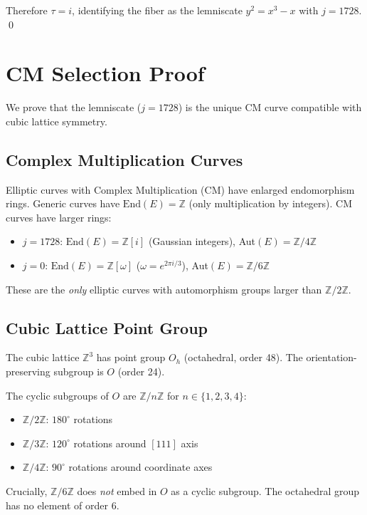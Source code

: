 \documentclass[11pt,a4paper]{article}
\theoremstyle{definition}
\theoremstyle{remark}
\newcommand{\Zthree}{\mathbb{Z}^3}
\begin{document}
Therefore $\tau = i$, identifying the fiber as the lemniscate $y^2 = x^3 - x$ with $j = 1728$. \qed

\section{CM Selection Proof}
\label{app:cm}

We prove that the lemniscate ($j = 1728$) is the unique CM curve compatible with cubic lattice symmetry.

\subsection*{Complex Multiplication Curves}

Elliptic curves with Complex Multiplication (CM) have enlarged endomorphism rings. Generic curves have $\text{End}(E) = \mathbb{Z}$ (only multiplication by integers). CM curves have larger rings:
\begin{itemize}
    \item $j = 1728$: $\text{End}(E) = \mathbb{Z}[i]$ (Gaussian integers), Aut$(E) = \mathbb{Z}/4\mathbb{Z}$
    \item $j = 0$: $\text{End}(E) = \mathbb{Z}[\omega]$ ($\omega = e^{2\pi i/3}$), Aut$(E) = \mathbb{Z}/6\mathbb{Z}$
\end{itemize}

These are the \emph{only} elliptic curves with automorphism groups larger than $\mathbb{Z}/2\mathbb{Z}$.

\subsection*{Cubic Lattice Point Group}

The cubic lattice $\Zthree$ has point group $O_h$ (octahedral, order 48). The orientation-preserving subgroup is $O$ (order 24).

The cyclic subgroups of $O$ are $\mathbb{Z}/n\mathbb{Z}$ for $n \in \{1, 2, 3, 4\}$:
\begin{itemize}
    \item $\mathbb{Z}/2\mathbb{Z}$: $180^\circ$ rotations
    \item $\mathbb{Z}/3\mathbb{Z}$: $120^\circ$ rotations around $[111]$ axis
    \item $\mathbb{Z}/4\mathbb{Z}$: $90^\circ$ rotations around coordinate axes
\end{itemize}

Crucially, $\mathbb{Z}/6\mathbb{Z}$ does \emph{not} embed in $O$ as a cyclic subgroup. The octahedral group has no element of order 6.
\end{document}
